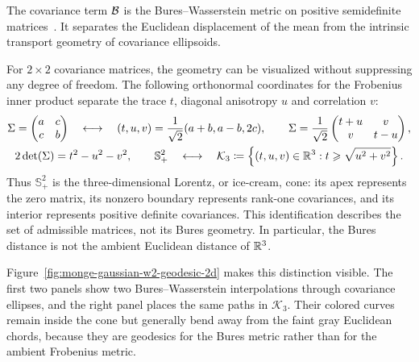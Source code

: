 The covariance term $\mathcal{B}$ is the Bures--Wasserstein metric on positive semidefinite matrices~\cite{bures1969extension,gelbrich1990formula,bhatia2018bures}. It separates the Euclidean displacement of the mean from the intrinsic transport geometry of covariance ellipsoids.
\begin{rem}\label{rem-2x2-covariance-cone}
	For $2\times2$ covariance matrices, the geometry can be visualized without suppressing any degree of freedom. The following orthonormal coordinates for the Frobenius inner product separate the trace $t$, diagonal anisotropy $u$ and correlation $v$:
	\begin{equation}\label{eq-2x2-covariance-cone}
		\begin{gathered}
			\Sigma=\begin{pmatrix}a&c\\c&b\end{pmatrix}
			\quad\longleftrightarrow\quad
			(t,u,v)=\frac{1}{\sqrt2}(a+b,a-b,2c),
			\qquad
			\Sigma=\frac{1}{\sqrt2}
			\begin{pmatrix}t+u&v\\v&t-u\end{pmatrix},
			\\
			2\det(\Sigma)=t^2-u^2-v^2,
			\qquad
			\mathbb S_+^2
			\quad\longleftrightarrow\quad
			\mathcal K_3
			\coloneqq
			\left\{(t,u,v)\in\mathbb{R}^3:t\geqslant\sqrt{u^2+v^2}\right\}.
		\end{gathered}
	\end{equation}
	Thus $\mathbb S_+^2$ is the three-dimensional Lorentz, or ice-cream, cone: its apex represents the zero matrix, its nonzero boundary represents rank-one covariances, and its interior represents positive definite covariances. This identification describes the set of admissible matrices, not its Bures geometry. In particular, the Bures distance is not the ambient Euclidean distance of $\mathbb{R}^3$.

	Figure~\ref{fig:monge-gaussian-w2-geodesic-2d} makes this distinction visible. The first two panels show two Bures--Wasserstein interpolations through covariance ellipses, and the right panel places the same paths in $\mathcal K_3$. Their colored curves remain inside the cone but generally bend away from the faint gray Euclidean chords, because they are geodesics for the Bures metric rather than for the ambient Frobenius metric.
\end{rem}

